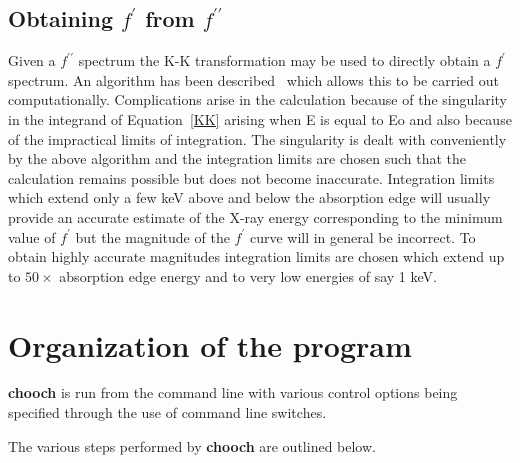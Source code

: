 \documentclass[a4paper]{article}
\begin{document}
\subsection*{Obtaining $f^{\prime}$ from $f^{\prime\prime}$}

Given a $f^{\prime\prime}$ spectrum the K-K transformation may be used
to directly obtain a $f^{\prime}$ spectrum. An algorithm has been
described~\cite{hoyt84:_deter_anomal_scatt_cu_ni} which allows this to
be carried out computationally.  Complications arise in the
calculation because of the singularity in the integrand of
Equation~\ref{KK} arising when E is equal to Eo and also because of
the impractical limits of integration.  The singularity is dealt with
conveniently by the above algorithm and the integration limits are
chosen such that the calculation remains possible but does not become
inaccurate. Integration limits which extend only a few keV above and
below the absorption edge will usually provide an accurate estimate of
the X-ray energy corresponding to the minimum value of $f^{\prime}$
but the magnitude of the $f^{\prime}$ curve will in general be
incorrect. To obtain highly accurate magnitudes integration limits are
chosen which extend up to $50 \times$ absorption edge energy and to
very low energies of say 1 keV.

\section*{Organization of the program}

{\bf chooch} is run from the command line with various control options
being specified through the use of command line switches.

The various steps performed by {\bf chooch} are outlined below.
\end{document}
